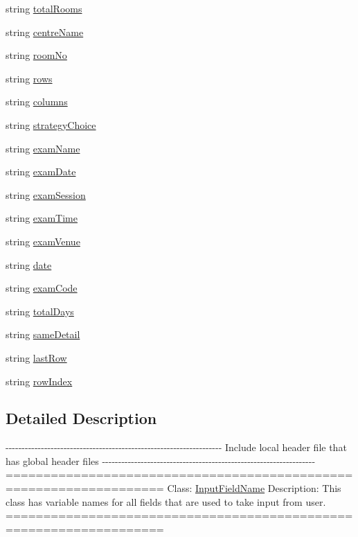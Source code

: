 \begin{DoxyCompactItemize}
\item 
string \hyperlink{classInputFieldName_a51fe8230341d7863ffd4672f2c986beb}{total\-Rooms}
\item 
string \hyperlink{classInputFieldName_a19c67f2d38cde97f856d4ca3639f4fc7}{centre\-Name}
\item 
string \hyperlink{classInputFieldName_abb6b245e03e76aa29d7ef8733298e72f}{room\-No}
\item 
string \hyperlink{classInputFieldName_a1b5a819437f52b4bb6b0ea59f542f9a9}{rows}
\item 
string \hyperlink{classInputFieldName_abca049f347e589f24b672c19907c5c72}{columns}
\item 
string \hyperlink{classInputFieldName_a9a6b827d404cb279cc0ed836c069e4a9}{strategy\-Choice}
\item 
string \hyperlink{classInputFieldName_a4cee41667cdc0e38f8f76af94ef39c36}{exam\-Name}
\item 
string \hyperlink{classInputFieldName_a4e60d793497c36b2d80e2411cbb915d8}{exam\-Date}
\item 
string \hyperlink{classInputFieldName_afef45e787d3c737f9bdc3126ce29d8b9}{exam\-Session}
\item 
string \hyperlink{classInputFieldName_ab667062be019e5912683d33c45885bd3}{exam\-Time}
\item 
string \hyperlink{classInputFieldName_affaa2fe8246959748f43ea58f161b2b5}{exam\-Venue}
\item 
string \hyperlink{classInputFieldName_afb053a44abe76e108533e23902e90321}{date}
\item 
string \hyperlink{classInputFieldName_a3cc09a852d20e96bb4908b9f66c01ed7}{exam\-Code}
\item 
string \hyperlink{classInputFieldName_a12ba65660edd7f8f7ecf1e25893716da}{total\-Days}
\item 
string \hyperlink{classInputFieldName_a6de91205e7eac3168e17d100ab4d8e64}{same\-Detail}
\item 
string \hyperlink{classInputFieldName_a12e0f0ec0ad7962271d6dae576e5ee0a}{last\-Row}
\item 
string \hyperlink{classInputFieldName_adfb1d136313267eecabe30391a03b49b}{row\-Index}
\end{DoxyCompactItemize}


\subsection{\-Detailed \-Description}
-\/-\/-\/-\/-\/-\/-\/-\/-\/-\/-\/-\/-\/-\/-\/-\/-\/-\/-\/-\/-\/-\/-\/-\/-\/-\/-\/-\/-\/-\/-\/-\/-\/-\/-\/-\/-\/-\/-\/-\/-\/-\/-\/-\/-\/-\/-\/-\/-\/-\/-\/-\/-\/-\/-\/-\/-\/-\/-\/-\/-\/-\/-\/-\/-\/-\/-\/ \-Include local header file that has global header files -\/-\/-\/-\/-\/-\/-\/-\/-\/-\/-\/-\/-\/-\/-\/-\/-\/-\/-\/-\/-\/-\/-\/-\/-\/-\/-\/-\/-\/-\/-\/-\/-\/-\/-\/-\/-\/-\/-\/-\/-\/-\/-\/-\/-\/-\/-\/-\/-\/-\/-\/-\/-\/-\/-\/-\/-\/-\/-\/-\/-\/-\/-\/-\/-\/-\/ =================================================================== \-Class\-: \hyperlink{classInputFieldName}{\-Input\-Field\-Name} \-Description\-: \-This class has variable names for all fields that are used to take input from user. =================================================================== 

